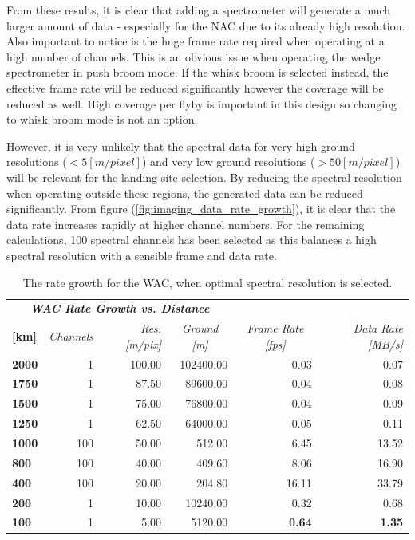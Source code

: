 From these results, it is clear that adding a spectrometer will generate a much larger amount of data - especially for the NAC due to its already high resolution. Also important to notice is the huge frame rate required when operating at a high number of channels. This is an obvious issue when operating the wedge spectrometer in push broom mode. If the whisk broom is selected instead, the effective frame rate will be reduced significantly however the coverage will be reduced as well. High coverage per flyby is important in this design so changing to whisk broom mode is not an option.

However, it is very unlikely that the spectral data for very high ground resolutions ($<5[m/pixel]$) and very low ground resolutions ($>50[m/pixel]$) will be relevant for the landing site selection. By reducing the spectral resolution when operating outside these regions, the generated data can be reduced significantly. From figure (\ref{fig:imaging_data_rate_growth}), it is clear that the data rate increases rapidly at higher channel numbers. For the remaining calculations, 100 spectral channels has been selected as this balances a high spectral resolution with a sensible frame and data rate.
\begin{table}[h!]
  \centering
    \begin{tabular}{l|r|r|r|r|r|}
\multicolumn{4}{c|}{\textit{\textbf{WAC Rate Growth vs. Distance}}} & \multicolumn{1}{r}{} & \multicolumn{1}{r}{} \bigstrut[b]\\
\cline{1-4}\textbf{[km]} & \textit{Channels} & \textit{Res. [m/pix]} & \multicolumn{1}{c|}{\textit{Ground [m]}} & \multicolumn{1}{c}{\textit{Frame Rate [fps]}} & \multicolumn{1}{r}{\textit{Data Rate [MB/s]}} \bigstrut\\
\hline
\textbf{2000} & 1     & 100.00 & 102400.00 & 0.03  & 0.07 \bigstrut[t]\\
\textbf{1750} & 1     & 87.50 & 89600.00 & 0.04  & 0.08 \\
\textbf{1500} & 1     & 75.00 & 76800.00 & 0.04  & 0.09 \\
\textbf{1250} & 1     & 62.50 & 64000.00 & 0.05  & 0.11 \\
\textbf{1000} & 100   & 50.00 & 512.00 & 6.45  & 13.52 \\
\textbf{800} & 100   & 40.00 & 409.60 & 8.06  & 16.90 \\
\textbf{400} & 100   & 20.00 & 204.80 & 16.11 & 33.79 \\
\textbf{200} & 1     & 10.00 & 10240.00 & 0.32  & 0.68 \\
\textbf{100} & 1     & 5.00  & 5120.00 & \textbf{0.64} & \textbf{1.35} \\
\end{tabular}%
  \caption{The rate growth for the WAC, when optimal spectral resolution is selected.}
  \label{tab:opt_rate_growth_wac}%
\end{table}%
